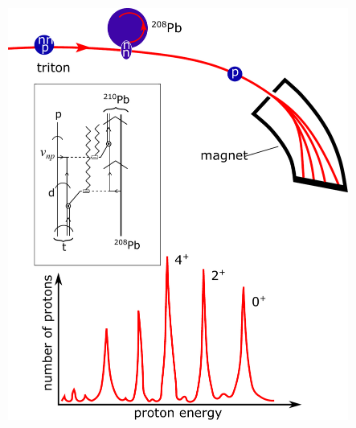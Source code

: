 \begin{figure}
\centerline {
\includegraphics*[width=9cm]{introduccion/figs/figintro3}
}

\end{figure}
